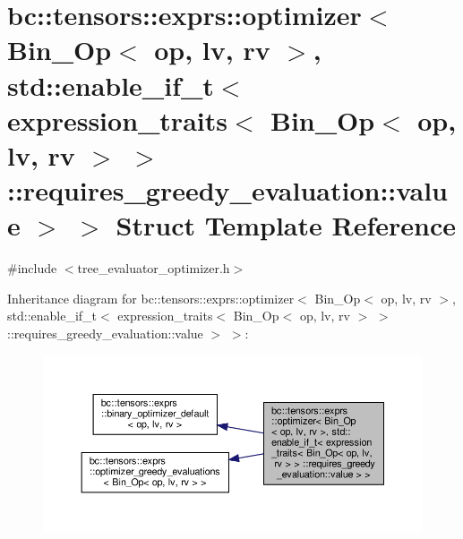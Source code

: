 \hypertarget{structbc_1_1tensors_1_1exprs_1_1optimizer_3_01Bin__Op_3_01op_00_01lv_00_01rv_01_4_00_01std_1_1en9f7937e0476e741d2784c5c0f63b3f8d}{}\section{bc\+:\+:tensors\+:\+:exprs\+:\+:optimizer$<$ Bin\+\_\+\+Op$<$ op, lv, rv $>$, std\+:\+:enable\+\_\+if\+\_\+t$<$ expression\+\_\+traits$<$ Bin\+\_\+\+Op$<$ op, lv, rv $>$ $>$ \+:\+:requires\+\_\+greedy\+\_\+evaluation\+:\+:value $>$ $>$ Struct Template Reference}
\label{structbc_1_1tensors_1_1exprs_1_1optimizer_3_01Bin__Op_3_01op_00_01lv_00_01rv_01_4_00_01std_1_1en9f7937e0476e741d2784c5c0f63b3f8d}


{\ttfamily \#include $<$tree\+\_\+evaluator\+\_\+optimizer.\+h$>$}



Inheritance diagram for bc\+:\+:tensors\+:\+:exprs\+:\+:optimizer$<$ Bin\+\_\+\+Op$<$ op, lv, rv $>$, std\+:\+:enable\+\_\+if\+\_\+t$<$ expression\+\_\+traits$<$ Bin\+\_\+\+Op$<$ op, lv, rv $>$ $>$ \+:\+:requires\+\_\+greedy\+\_\+evaluation\+:\+:value $>$ $>$\+:\nopagebreak
\begin{figure}[H]
\begin{center}
\leavevmode
\includegraphics[width=350pt]{structbc_1_1tensors_1_1exprs_1_1optimizer_3_01Bin__Op_3_01op_00_01lv_00_01rv_01_4_00_01std_1_1enb5417330c70c5b97ce635e2e168486d8}
\end{center}
\end{figure}


